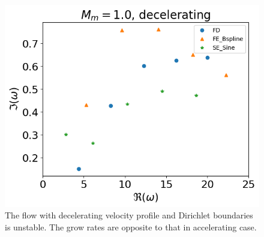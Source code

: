 \begin{figure} [H]
	\centering
	\includegraphics[width=0.7\linewidth]{img/numerical_experiments/decelerating_v}
	\caption{The flow with decelerating velocity profile and Dirichlet boundaries is unstable. The grow rates are opposite to that in accelerating case.}
	\label{fig:decelerating_v}
\end{figure}

